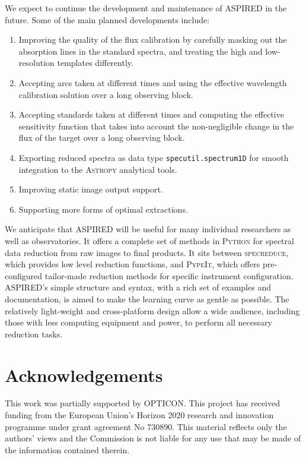 \documentclass[linenumbers, twocolumn]{aastex631}
\begin{document}
We expect to continue the development and maintenance of \textsc{ASPIRED} in the
future. Some of the main planned developments include:
\begin{enumerate}
    \item Improving the quality of the flux calibration by
    carefully masking out the absorption lines in the standard spectra, and
    treating the high and low-resolution templates differently.
    \item Accepting arcs taken at different times and using the effective wavelength
    calibration solution over a long observing block.
    \item Accepting standards taken at different times and computing the effective
    sensitivity function that takes into account the non-negligible change
    in the flux of the target over a long observing block.
    \item Exporting reduced spectra as data type \texttt{specutil.spectrum1D}
    for smooth integration to the \textsc{Astropy} analytical tools.
    \item Improving static image output support.
    \item Supporting more forms of optimal extractions.
\end{enumerate}

We anticipate that ASPIRED will be useful for many individual researchers as
well as observatories. It offers a complete set of methods in \textsc{Python}
for spectral data reduction from raw images to final products. It sits between
\textsc{specreduce}, which provides low level reduction functions, and 
\textsc{PypeIt}, which offers pre-configured tailor-made reduction methods for
specific instrument configuration. ASPIRED's simple structure and syntax, with a
rich set of examples and documentation, is aimed to make the learning curve
as gentle as possible. The relatively light-weight and cross-platform design
allow a wide audience, including those with less computing equipment and power,
to perform all necessary reduction tasks.


\section*{Acknowledgements}
This work was partially supported by OPTICON. This project has
received funding from the European Union's Horizon 2020 research and
innovation programme under grant agreement No 730890. This material
reflects only the authors' views and the Commission is not liable for
any use that may be made of the information contained therein.
\end{document}
